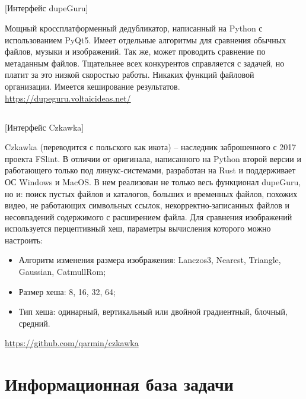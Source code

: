 \documentclass[variant=courcework]{bsuir}
\begin{document}
\subsection{}

[Интерфейс dupeGuru]

Мощный кроссплатформенный дедубликатор, написанный на Python с использованием
PyQt5. Имеет отдельные алгоритмы для сравнения обычных файлов, музыки и
изображений. Так же, может проводить сравнение по метаданным файлов. Тщательнее
всех конкурентов справляется с задачей, но платит за это низкой скоростью
работы. Никаких функций файловой организации. Имеется кеширование результатов.\\

\url{https://dupeguru.voltaicideas.net/}

\subsection{}

[Интерфейс Czkawka]

Czkawka (переводится с польского как икота) -- наследник заброшенного с 2017
проекта FSlint. В отличии от оригинала, написанного на Python второй версии и
работающего только под линукс-системами, разработан на Rust и поддерживает ОС
Windows и MacOS. В нем реализован не только весь функционал dupeGuru, но и:
поиск пустых файлов и каталогов, больших и временных файлов, похожих видео, не
работающих символьных ссылок, некорректно-записанных файлов и несовпадений
содержимого с расширением файла. Для сравнения изображений используется
перцептивный хеш, параметры вычисления которого можно настроить:

\begin{itemize}
    \item Алгоритм изменения размера изображения: Lanczos3, Nearest, Triangle,
          Gaussian, CatmullRom;
    \item Размер хеша: 8, 16, 32, 64;
    \item Тип хеша: одинарный, вертикальный или двойной градиентный, блочный,
          средний.
\end{itemize}

\url{https://github.com/qarmin/czkawka}

\section{Информационная база задачи}
\end{document}
